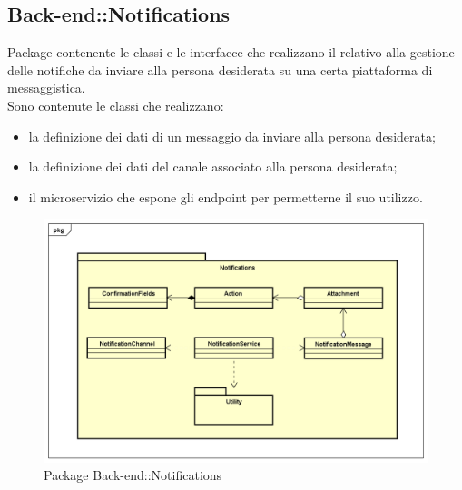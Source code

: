 \subsection{Back-end::Notifications}
Package contenente le classi e le interfacce che realizzano il  relativo alla gestione delle notifiche da inviare alla persona desiderata su una certa piattaforma di messaggistica.\\ Sono contenute le classi che realizzano: \begin{itemize} \item la definizione dei dati di un messaggio da inviare alla persona desiderata; \item la definizione dei dati del canale associato alla persona desiderata; \item il microservizio che espone gli endpoint per permetterne il suo utilizzo. \end{itemize}
\begin{figure}[h] \centering \includegraphics[width=\textwidth,height=\textheight,keepaspectratio]{images/diagrams/back-end/Official_Backend_0304/Notifications.png}
	\caption{Package Back-end::Notifications}
\end{figure}
\newpage

